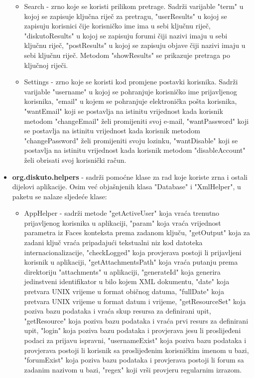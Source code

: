 \documentclass{foi}
\begin{document}
\begin{itemize}
\begin{itemize}
	\item Search - zrno koje se koristi prilikom pretrage. Sadrži varijable "term" u kojoj se zapisuje ključna riječ za pretragu, "userResults" u kojoj se zapisuju korisnici čije korisničko ime ima u sebi ključnu riječ, "diskutoResults" u kojoj se zapisuju forumi čiji nazivi imaju u sebi ključnu riječ, "postResults" u kojoj se zapisuju objave čiji nazivi imaju u sebi ključnu riječ. Metodom "showResults" se prikazuje pretraga po ključnoj riječi.
	\item Settings - zrno koje se koristi kod promjene postavki korisnika. Sadrži varijable "username" u kojoj se pohranjuje korisničko ime prijavljenog korisnika, "email" u kojem se pohranjuje elektronička pošta korisnika, "wantEmail" koji se postavlja na istinitu vrijednost kada korisnik metodom "changeEmail" želi promijeniti svoj e-mail, "wantPassword" koji se postavlja na istinitu vrijednost kada korisnik metodom "changePassword" želi promijeniti svoju lozinku, "wantDisable" koji se postavlja na istinitu vrijednost kada korisnik metodom "disableAccount" želi obrisati svoj korisnički račun.
\end{itemize}
\item \textbf{org.diskuto.helpers} - sadrži pomoćne klase za rad koje koriste zrna i ostali dijelovi aplikacije. Osim već objašnjenih klasa "Database" i "XmlHelper", u paketu se nalaze sljedeće klase:
\begin{itemize}
	\item AppHelper - sadrži metode "getActiveUser" koja vraća trenutno prijavljenog korisnika u aplikaciji, "param" koja vraća vrijednost parametra iz Faces konteksta prema zadanom ključu, "getOutput" koja za zadani ključ vraća pripadajući tekstualni niz kod datoteka internacionalizacije, "checkLogged" koja provjerava postoji li prijavljeni korisnik u aplikaciji, "getAttachmentsPath" koja vraća putanju prema direktoriju "attachments" u aplikaciji, "generateId" koja generira jedinstveni identifikator u bilo kojem XML dokumentu, "date" koja pretvara UNIX vrijeme u format običnog datuma, "fullDate" koja pretvara UNIX vrijeme u format datum i vrijeme, "getResourceSet" koja poziva bazu podataka i vraća skup resursa za definirani upit, "getResource" koja poziva bazu podataka i vraća prvi resurs za definirani upit, "login" koja poziva bazu podataka i provjerava jesu li proslijeđeni podaci za prijavu ispravni, "usernameExist" koja poziva bazu podataka i provjerava postoji li korisnik sa proslijeđenim korisničkim imenom u bazi, "forumExist" koja poziva bazu podataka i provjerava postoji li forum sa zadanim nazivom u bazi, "regex" koji vrši provjeru regularnim izrazom.

\end{itemize}
\end{itemize}
\end{document}
